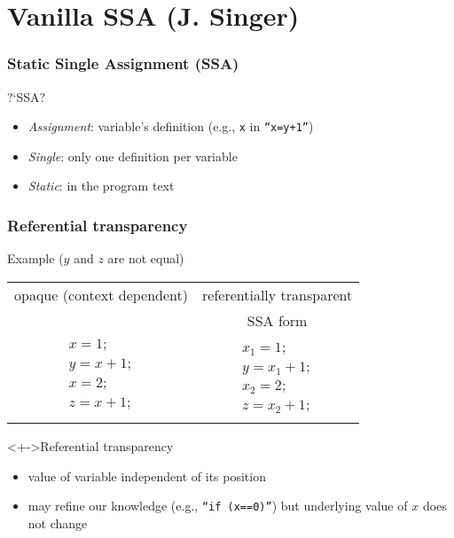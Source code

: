 \section{Vanilla SSA (J. Singer)}

\begin{frame}
  \frametitle{Static Single Assignment (SSA)}
\begin{block}{?`SSA?}
  \begin{itemize}
    \item \emph{Assignment}: variable's definition (e.g., \texttt{x} in \texttt{``x=y+1''})
    \item \emph{Single}: only one definition per variable
    \item \emph{Static}: in the program text
  \end{itemize}
\end{block}
\end{frame}

\begin{frame}
\frametitle{Referential transparency}
\begin{block}{Example ($y$ and $z$ are not equal)}
\begin{tabular}{c|c}
opaque (context dependent)& referentially transparent\\
 & SSA form\\ \hline
\begin{minipage}{0.45\textwidth}
\begin{equation*}
\begin{array}{l}
x = 1;\\
y = x + 1;\\
x = 2;\\
z = x + 1;\\
\end{array}
\end{equation*}
\end{minipage} &
\begin{minipage}{0.35\textwidth}
\begin{equation*}
\begin{array}{l}
x_1 = 1;\\
y  = x_1 + 1;\\
x_2 = 2;\\
z  = x_2 + 1;
\end{array}
\end{equation*}
\end{minipage}
\end{tabular}
\end{block}
\pause
\begin{exampleblock}<+->{Referential transparency}
\begin{itemize}
\item value of variable independent of its position
\item may refine our knowledge (e.g., \texttt{``if (x==0)''}) but underlying value of $x$ does not change
\end{itemize}
\end{exampleblock}
\end{frame}

